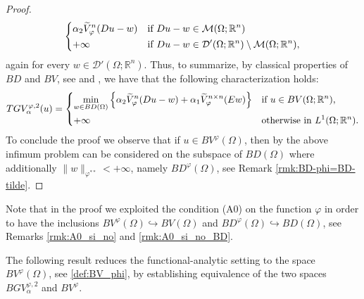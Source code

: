 \documentclass[a4paper,11pt,oneside,notitlepage]{article}
\numberwithin{equation}{section}
\def\R{\mathbb{R}}
\def\M{\mathcal{M}}
\newcommand{\vphi}{\varphi}
\begin{document}
\begin{proof}
\begin{equation*}
\begin{dcases}
            \alpha_2 \widetilde{V}_\vphi^n (Du-w) &\textnormal{if } Du - w \in \M(\Omega;\R^n) \\
            +\infty & \textnormal{if } Du-w \in {\mathcal D}'(\Omega;\R^n) \setminus \M(\Omega;\R^n),
        \end{dcases}
    \end{equation*}
    again for every $w\in {\mathcal D}'(\Omega;\R^n)$. Thus, to summarize, by classical properties of $BD$ and $BV$, see \cite[Chapter II, Theorem 2.3]{temam} and \cite{AFP}, we have that the following characterization holds:
    \begin{equation}
    \label{eq_min_inf}
        TGV^{\vphi, 2}_\alpha(u) = 
        \begin{dcases}
            \min_{w \in BD(\Omega)} \left\{ \alpha_2 \widetilde{V}_\vphi^n (Du-w) + \alpha_1 \widetilde{V}_\vphi^{n \times n}(E w) \right\} & \textnormal{if } u\in BV(\Omega;\R^n), \\
            +\infty & \textnormal{otherwise in } L^1(\Omega;\R^n).
        \end{dcases}
    \end{equation}
    To conclude the proof we observe that if $u \in BV^\vphi(\Omega)$, then by \cite[Theorem 3.4.6]{HaH} the above infimum problem can be considered on the subspace of $BD(\Omega)$ where additionally $\|w\|_{\vphi^{**}} < +\infty$, namely $BD^\vphi(\Omega)$, see Remark \ref{rmk:BD-phi=BD-tilde}.
\end{proof}

Note that in the proof we exploited the condition (A0) on the function $\vphi$ in order to have the inclusions $BV^\vphi(\Omega) \hookrightarrow BV(\Omega)$ and $BD^\vphi(\Omega) \hookrightarrow BD(\Omega)$, see Remarks \ref{rmk:A0_si_no} and \ref{rmk:A0_si_no_BD}.


\noindent The following result reduces the functional-analytic setting to the space $BV^\vphi(\Omega)$, see \eqref{def:BV_phi}, by establishing equivalence of the two spaces $BGV^{\vphi,2}_\alpha$ and $BV^\vphi$.
\end{document}
